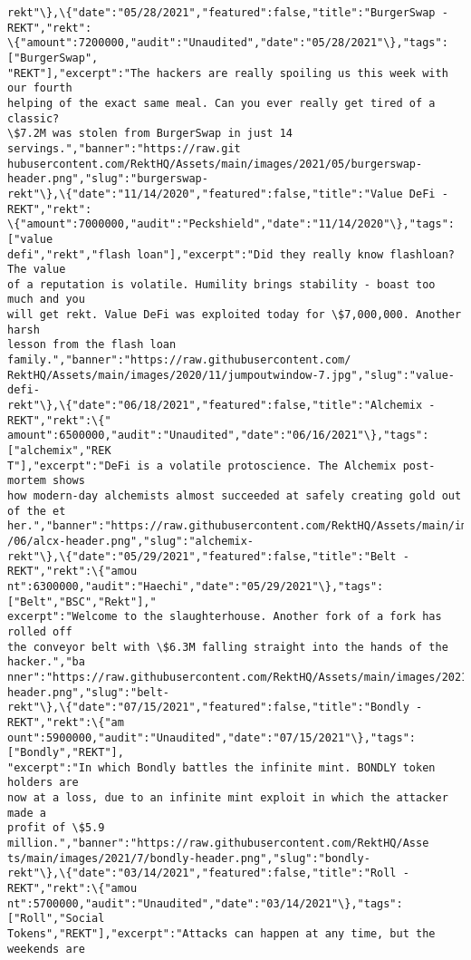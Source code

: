 \documentclass[11pt]{article}
\begin{document}
\begin{Verbatim}[commandchars=\\\{\}]
rekt"\},\{"date":"05/28/2021","featured":false,"title":"BurgerSwap - REKT","rekt":
\{"amount":7200000,"audit":"Unaudited","date":"05/28/2021"\},"tags":["BurgerSwap",
"REKT"],"excerpt":"The hackers are really spoiling us this week with our fourth
helping of the exact same meal. Can you ever really get tired of a classic?
\$7.2M was stolen from BurgerSwap in just 14 servings.","banner":"https://raw.git
hubusercontent.com/RektHQ/Assets/main/images/2021/05/burgerswap-
header.png","slug":"burgerswap-
rekt"\},\{"date":"11/14/2020","featured":false,"title":"Value DeFi - REKT","rekt":
\{"amount":7000000,"audit":"Peckshield","date":"11/14/2020"\},"tags":["value
defi","rekt","flash loan"],"excerpt":"Did they really know flashloan? The value
of a reputation is volatile. Humility brings stability - boast too much and you
will get rekt. Value DeFi was exploited today for \$7,000,000. Another harsh
lesson from the flash loan family.","banner":"https://raw.githubusercontent.com/
RektHQ/Assets/main/images/2020/11/jumpoutwindow-7.jpg","slug":"value-defi-
rekt"\},\{"date":"06/18/2021","featured":false,"title":"Alchemix - REKT","rekt":\{"
amount":6500000,"audit":"Unaudited","date":"06/16/2021"\},"tags":["alchemix","REK
T"],"excerpt":"DeFi is a volatile protoscience. The Alchemix post-mortem shows
how modern-day alchemists almost succeeded at safely creating gold out of the et
her.","banner":"https://raw.githubusercontent.com/RektHQ/Assets/main/images/2021
/06/alcx-header.png","slug":"alchemix-
rekt"\},\{"date":"05/29/2021","featured":false,"title":"Belt - REKT","rekt":\{"amou
nt":6300000,"audit":"Haechi","date":"05/29/2021"\},"tags":["Belt","BSC","Rekt"],"
excerpt":"Welcome to the slaughterhouse. Another fork of a fork has rolled off
the conveyor belt with \$6.3M falling straight into the hands of the hacker.","ba
nner":"https://raw.githubusercontent.com/RektHQ/Assets/main/images/2021/05/belt-
header.png","slug":"belt-
rekt"\},\{"date":"07/15/2021","featured":false,"title":"Bondly - REKT","rekt":\{"am
ount":5900000,"audit":"Unaudited","date":"07/15/2021"\},"tags":["Bondly","REKT"],
"excerpt":"In which Bondly battles the infinite mint. BONDLY token holders are
now at a loss, due to an infinite mint exploit in which the attacker made a
profit of \$5.9 million.","banner":"https://raw.githubusercontent.com/RektHQ/Asse
ts/main/images/2021/7/bondly-header.png","slug":"bondly-
rekt"\},\{"date":"03/14/2021","featured":false,"title":"Roll - REKT","rekt":\{"amou
nt":5700000,"audit":"Unaudited","date":"03/14/2021"\},"tags":["Roll","Social
Tokens","REKT"],"excerpt":"Attacks can happen at any time, but the weekends are

\end{Verbatim}
\end{document}
